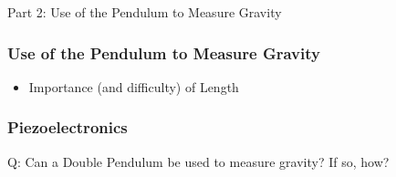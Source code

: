 \documentclass{beamer}
\begin{document}
\begin{frame}
\begin{exampleblock}{}
\begin{center}
\vskip 20pt
\Huge
Part 2: Use of the Pendulum to Measure Gravity
\vskip 6pt
\ 
\end{center}
\end{exampleblock}
\end{frame}

\begin{frame}
\frametitle{Use of the Pendulum to Measure Gravity}
\begin{itemize}
\item Importance (and difficulty) of Length
\end{itemize}
\end{frame}

\begin{frame}
\frametitle{Piezoelectronics}
\end{frame}

\begin{frame}
\begin{exampleblock}{}
\begin{center}
\vskip 20pt
\Huge
Q: Can a Double Pendulum be used to measure gravity?
\vskip 12pt
If so, how?
\vskip 6pt
\ 
\end{center}
\end{exampleblock}
\end{frame}
\end{document}

